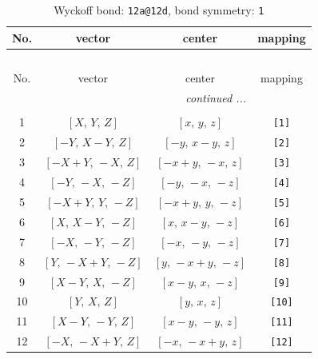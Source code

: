 \documentclass[fleqn,8pt]{jsarticle}
\begin{document}
\begin{longtable}{cccc}
\caption{Wyckoff bond: {\tt 12a@12d}, bond symmetry: {\tt 1}}
 \\
 \hline \hline
No. & vector & center & mapping \\ \hline \endfirsthead

\multicolumn{3}{l}{\tablename\ \thetable{}} \\
 \hline \hline
No. & vector & center & mapping \\ \hline \endhead

 \hline \hline
\multicolumn{3}{r}{\footnotesize\it continued ...} \\ \endfoot

 \hline \hline
\multicolumn{3}{r}{} \\ \endlastfoot

1 & $\left[ X,\, Y,\, Z \right]$ & $\left[ x,\, y,\, z \right]$ & {\tt [1]} \\ \hline
2 & $\left[ - Y,\, X - Y,\, Z \right]$ & $\left[ - y,\, x - y,\, z \right]$ & {\tt [2]} \\ \hline
3 & $\left[ - X + Y,\, - X,\, Z \right]$ & $\left[ - x + y,\, - x,\, z \right]$ & {\tt [3]} \\ \hline
4 & $\left[ - Y,\, - X,\, - Z \right]$ & $\left[ - y,\, - x,\, - z \right]$ & {\tt [4]} \\ \hline
5 & $\left[ - X + Y,\, Y,\, - Z \right]$ & $\left[ - x + y,\, y,\, - z \right]$ & {\tt [5]} \\ \hline
6 & $\left[ X,\, X - Y,\, - Z \right]$ & $\left[ x,\, x - y,\, - z \right]$ & {\tt [6]} \\ \hline
7 & $\left[ - X,\, - Y,\, - Z \right]$ & $\left[ - x,\, - y,\, - z \right]$ & {\tt [7]} \\ \hline
8 & $\left[ Y,\, - X + Y,\, - Z \right]$ & $\left[ y,\, - x + y,\, - z \right]$ & {\tt [8]} \\ \hline
9 & $\left[ X - Y,\, X,\, - Z \right]$ & $\left[ x - y,\, x,\, - z \right]$ & {\tt [9]} \\ \hline
10 & $\left[ Y,\, X,\, Z \right]$ & $\left[ y,\, x,\, z \right]$ & {\tt [10]} \\ \hline
11 & $\left[ X - Y,\, - Y,\, Z \right]$ & $\left[ x - y,\, - y,\, z \right]$ & {\tt [11]} \\ \hline
12 & $\left[ - X,\, - X + Y,\, Z \right]$ & $\left[ - x,\, - x + y,\, z \right]$ & {\tt [12]} \\
\end{longtable}
\end{document}
